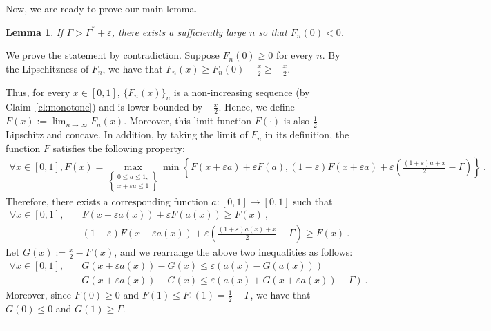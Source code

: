 \documentclass[11pt,letterpaper]{article}
\newenvironment{proof}{{\bf Proof:  }}{\hfill\rule{2mm}{2mm}\vspace*{5pt}}
\newtheorem{lemma}{Lemma}[section]
\newcommand{\eps}{\varepsilon}
\begin{document}
Now, we are ready to prove our main lemma.
\begin{lemma}
\label{lem:math}
If $\Gamma > \Gamma^* + \eps$, there exists a sufficiently large $n$ so that $F_n(0) < 0$.	
\end{lemma}
\begin{proof}
We prove the statement by contradiction. Suppose $F_n(0) \ge 0$ for every $n$. 
By the Lipschitzness of $F_n$, we have that $F_n(x) \ge F_n(0) - \frac{x}{2} \ge - \frac{x}{2}$. 

Thus, for every $x \in [0,1]$, $\{F_n(x)\}_n$ is a non-increasing sequence (by Claim~\ref{cl:monotone}) and is lower bounded by $-\frac{x}{2}$. Hence, we define $F(x) := \lim_{n \to \infty}F_n(x)$.
Moreover, this limit function $F(\cdot)$ is also $\frac{1}{2}$-Lipschitz and concave. 
In addition, by taking the limit of $F_n$ in its definition, the function $F$ satisfies the following property:\begin{align*}
\forall x \in [0,1], F(x) = \max_{ \left\{ \substack{0\le a\le 1, \\ x+\eps a\le 1} \right\}} \min \left\{ F(x+\eps a) + \eps F(a), (1-\eps)F(x+\eps a) + \eps \left(\frac{(1+\eps)a + x}{2} - \Gamma \right)\right\}~.
\end{align*}
Therefore, there exists a corresponding function $a:[0,1] \to [0,1]$ such that
\begin{align*}
\forall x \in [0,1], \quad & F(x+\eps a(x)) +  \eps F(a(x)) \ge F(x)~, \\
& (1-\eps)F(x+\eps a(x)) + \eps \left(\frac{(1+\eps)a(x)+x}{2}-\Gamma \right) \ge F(x)~.
\end{align*}
Let $G(x) := \frac{x}{2} - F(x)$, and we rearrange the above two inequalities as follows:
\begin{align*}
\forall x \in [0,1], \quad & G(x+\eps a(x)) - G(x) \le \eps (a(x) - G(a(x)))\\
& G(x+\eps a(x)) - G(x) \le \eps (a(x)+G(x+\eps a(x))-\Gamma)~.
\end{align*}
Moreover, since $F(0) \ge 0$ and $F(1) \le F_1(1) = \frac{1}{2} -\Gamma$, we have that $G(0) \le 0$ and $G(1) \ge \Gamma$.


\end{proof}
\end{document}
